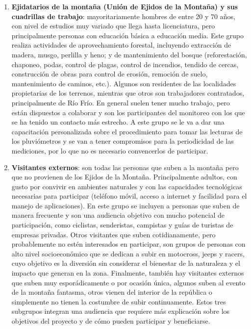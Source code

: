 \begin{enumerate}
    \item \textbf{Ejidatarios de la montaña (Unión de Ejidos de la Montaña) y sus cuadrillas de trabajo}: mayoritariamente hombres de entre 20 y 70 años, con nivel de estudios muy variado que llega hasta licenciatura, pero principalmente personas con educación básica a educación media. Este grupo realiza actividades de aprovechamiento forestal, incluyendo extracción de madera, musgo, perlilla y heno; y de mantenimiento del bosque (reforestación, chaponeo, podas, control de plagas, control de incendios, tendido de cercas, construcción de obras para control de erosión, remoción de suelo, mantenimiento de caminos, etc.). Algunos son residentes de las localidades propietarias de los terrenos, mientras que otros son trabajadores contratados, principalmente de Río Frío. En general suelen tener mucho trabajo, pero están dispuestos a colaborar y son los participantes del monitoreo con los que se ha tenido un contacto más estrecho. A este grupo se le va a dar una capacitación personalizada sobre el procedimiento para tomar las lecturas de los pluviómetros y se van a tener compromisos para la periodicidad de las mediciones, por lo que no es necesario convencerlos de participar.
    \item \textbf{Visitantes externos}: son todas las personas que suben a la montaña pero que no provienen de los Ejidos de la Montaña. Principalmente adultos, con gusto por convivir en ambientes naturales y con las capacidades tecnológicas necesarias para participar (teléfono móvil, acceso a internet y facilidad para el manejo de aplicaciones). En este grupo se incluyen a personas que suben de manera frecuente y son una audiencia objetivo con mucho potencial de participación, como ciclistas, senderistas, campistas y guías de turistas de empresas privadas. Otros visitantes que suben cotidianamente, pero probablemente no estén interesados en participar, son grupos de personas con alto nivel socioeconómico que se dedican a subir en motocross, jeeps y racers, cuyo objetivo es la diversión sin considerar el bienestar de la naturaleza y el impacto que generan en la zona. Finalmente, también hay visitantes externos que suben muy esporádicamente o por ocasión única, algunos suben al evento de la montaña fantasma, otros vienen del interior de la república o simplemente no tienen la costumbre de subir continuamente. Estos tres subgrupos integran una audiencia que requiere más explicación sobre los objetivos del proyecto y de cómo pueden participar y beneficiarse.

\end{enumerate}
